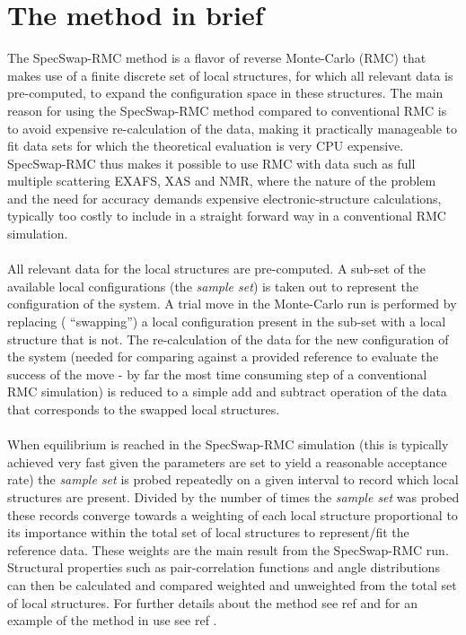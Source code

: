 \documentclass[a4paper, 10pt]{article}
\begin{document}
\section{The method in brief}
The SpecSwap-RMC method \cite{SS-RMC} is a flavor of reverse Monte-Carlo (RMC)
\cite{RMC} that makes use of a finite discrete set of local
structures, for which all relevant data is pre-computed, to
expand the configuration space in these structures. The main reason for using the SpecSwap-RMC method
compared to conventional RMC is to avoid expensive re-calculation of
the data, making it practically manageable to fit data sets for which the
theoretical evaluation is very CPU expensive. SpecSwap-RMC thus makes it
possible to use RMC with data such as full multiple scattering EXAFS,
XAS and NMR, where the nature of the problem and the need for accuracy
demands expensive electronic-structure calculations, typically too costly to
include in a straight forward way in a conventional RMC simulation.
\\\\
All relevant data for the local structures are
pre-computed. A sub-set of the available local configurations (the
{\it sample set}) is taken
out to represent the configuration of the system. A trial move in the
Monte-Carlo run is performed by replacing ( ``swapping'') a local
configuration present in the sub-set with a local structure that is
not. The re-calculation of the data for the new configuration of the
system (needed for comparing against a provided reference to evaluate
the success of the move - by far the most time consuming step of a
conventional RMC simulation) is reduced to a simple add and
subtract operation of the data that
corresponds to the swapped local structures.
\\\\
When equilibrium is reached in the SpecSwap-RMC simulation (this is
typically achieved very fast given the parameters are set to yield a
reasonable acceptance rate) the {\it sample set} is probed repeatedly on a given
interval to record which local structures are present. Divided by the
number of times the {\it sample set} was probed these records
converge towards a weighting of each local structure proportional to its
importance within the total set of local structures to represent/fit the
reference data. These weights are the main result from the
SpecSwap-RMC run. Structural properties such as pair-correlation
functions and angle distributions can then be calculated and compared
weighted and unweighted
from the total set of local structures. For further details about the
method see ref \cite{SS-RMC} and for an example of the method in use see ref \cite{SS-RMC-EXAFS}.
\end{document}
